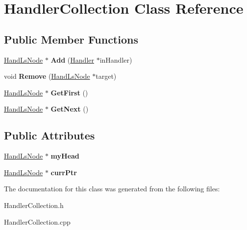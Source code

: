 \hypertarget{class_handler_collection}{}\section{Handler\+Collection Class Reference}
\label{class_handler_collection}
\subsection*{Public Member Functions}
\begin{DoxyCompactItemize}
\item 
\hypertarget{class_handler_collection_addbedfb20eb3cf420181d24cdf637e04}{}\label{class_handler_collection_addbedfb20eb3cf420181d24cdf637e04} 
\hyperlink{struct_hand_ls_node}{Hand\+Ls\+Node} $\ast$ {\bfseries Add} (\hyperlink{class_handler}{Handler} $\ast$in\+Handler)
\item 
\hypertarget{class_handler_collection_af12bcbf2f10f593abcf11ef36b22036d}{}\label{class_handler_collection_af12bcbf2f10f593abcf11ef36b22036d} 
void {\bfseries Remove} (\hyperlink{struct_hand_ls_node}{Hand\+Ls\+Node} $\ast$target)
\item 
\hypertarget{class_handler_collection_a63a6d4616f0410f8e9c5b3d2965a424b}{}\label{class_handler_collection_a63a6d4616f0410f8e9c5b3d2965a424b} 
\hyperlink{struct_hand_ls_node}{Hand\+Ls\+Node} $\ast$ {\bfseries Get\+First} ()
\item 
\hypertarget{class_handler_collection_a0ef8229aa3a1591351897dded37cd07e}{}\label{class_handler_collection_a0ef8229aa3a1591351897dded37cd07e} 
\hyperlink{struct_hand_ls_node}{Hand\+Ls\+Node} $\ast$ {\bfseries Get\+Next} ()
\end{DoxyCompactItemize}
\subsection*{Public Attributes}
\begin{DoxyCompactItemize}
\item 
\hypertarget{class_handler_collection_abf67414e513553827caa3664675224b7}{}\label{class_handler_collection_abf67414e513553827caa3664675224b7} 
\hyperlink{struct_hand_ls_node}{Hand\+Ls\+Node} $\ast$ {\bfseries my\+Head}
\item 
\hypertarget{class_handler_collection_a86ad3cf7be660dfad3c6e7bfc6ed31a8}{}\label{class_handler_collection_a86ad3cf7be660dfad3c6e7bfc6ed31a8} 
\hyperlink{struct_hand_ls_node}{Hand\+Ls\+Node} $\ast$ {\bfseries curr\+Ptr}
\end{DoxyCompactItemize}


The documentation for this class was generated from the following files\+:\begin{DoxyCompactItemize}
\item 
Handler\+Collection.\+h\item 
Handler\+Collection.\+cpp\end{DoxyCompactItemize}
